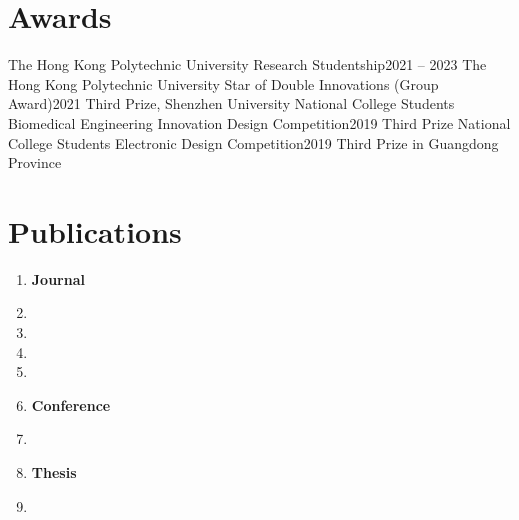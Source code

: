 \documentclass[letterpaper,11pt]{article}
\begin{document}
    \section{Awards}

    \resumeSubHeadingListStart
        \resumeSubheading
            {The Hong Kong Polytechnic University Research Studentship}{2021 -- 2023}
            {The Hong Kong Polytechnic University}{}
        \resumeSubheading
            {Star of Double Innovations (Group Award)}{2021}
            {Third Prize, Shenzhen University}{}
        \resumeSubheading
            {National College Students Biomedical Engineering Innovation Design Competition}{2019}
            {Third Prize}{}
        \resumeSubheading
            {National College Students Electronic Design Competition}{2019}
            {Third Prize in Guangdong Province}{}
    \resumeSubHeadingListEnd

    \section{Publications}
    
    

    \begin{enumerate}[leftmargin=0.15in, label={}, itemsep=0em]
        
        
        \item \textbf{Journal}
        \item {}
        \item {}
        \item {}
        \item {}
        
        \newpage
        \item \textbf{Conference}
        \item {}

        \item \textbf{Thesis}
        \item {}
     \end{enumerate}
\end{document}
